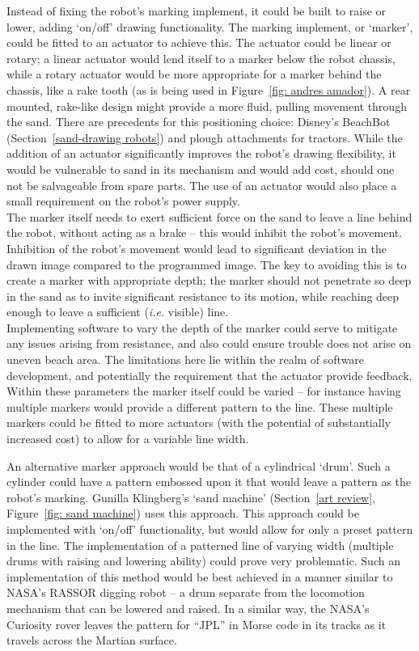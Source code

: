     Instead of fixing the robot's marking implement, it could be built to raise or lower, adding `on/off' drawing functionality. The marking implement, or `marker', could be fitted to an actuator to achieve this. The actuator could be linear or rotary; a linear actuator would lend itself to a marker below the robot chassis, while a rotary actuator would be more appropriate for a marker behind the chassis, like a rake tooth (as is being used in Figure~\ref{fig: andres amador}). A rear mounted, rake-like design might provide a more fluid, pulling movement through the sand. There are precedents for this positioning choice: Disney's BeachBot (Section~\ref{sand-drawing robots}) and plough attachments for tractors. While the addition of an actuator significantly improves the robot's drawing flexibility, it would be vulnerable to sand in its mechanism and would add cost, should one not be salvageable from spare parts. The use of an actuator would also place a small requirement on the robot's power supply.\\
    The marker itself needs to exert sufficient force on the sand to leave a line behind the robot, without acting as a brake -- this would inhibit the robot's movement. Inhibition of the robot's movement would lead to significant deviation in the drawn image compared to the programmed image. The key to avoiding this is to create a marker with appropriate depth; the marker should not penetrate so deep in the sand as to invite significant resistance to its motion, while reaching deep enough to leave a sufficient (\emph{i.e.} visible) line.\\
    Implementing software to vary the depth of the marker could serve to mitigate any issues arising from resistance, and also could ensure trouble does not arise on uneven beach area. The limitations here lie within the realm of software development, and potentially the requirement that the actuator provide feedback.\\
    Within these parameters the marker itself could be varied -- for instance having multiple markers would provide a different pattern to the line. These multiple markers could be fitted to more actuators (with the potential of substantially increased cost) to allow for a variable line width.

    An alternative marker approach would be that of a cylindrical `drum'. Such a cylinder could have a pattern embossed upon it that would leave a pattern as the robot's marking. Gunilla Klingberg's `sand machine' (Section~\ref{art review}, Figure~\ref{fig: sand machine}) uses this approach. This approach could be implemented with `on/off' functionality, but would allow for only a preset pattern in the line. The implementation of a patterned line of varying width (\eg multiple drums with raising and lowering ability) could prove very problematic. Such an implementation of this method would be best achieved in a manner similar to NASA's RASSOR digging robot -- a drum separate from the locomotion mechanism that can be lowered and raised.\cite{Siceloff2013} In a similar way, the NASA's Curiosity rover leaves the pattern for ``JPL'' in Morse code in its tracks as it travels across the Martian surface.

